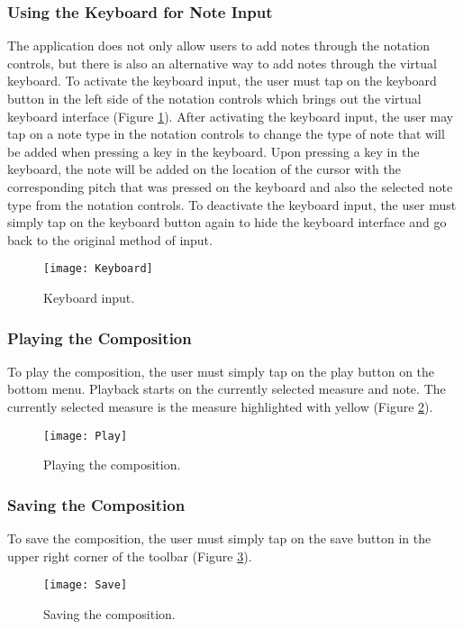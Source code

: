 \subsubsection{Using the Keyboard for Note Input}
The application does not only allow users to add notes through the notation controls, but there is also an alternative way to add notes through the virtual keyboard. To activate the keyboard input, the user must tap on the keyboard button in the left side of the notation controls which brings out the virtual keyboard interface (Figure \ref{fig:keyboard}). After activating the keyboard input, the user may tap on a note type in the notation controls to change the type of note that will be added when pressing a key in the keyboard. Upon pressing a key in the keyboard, the note will be added on the location of the cursor with the corresponding pitch that was pressed on the keyboard and also the selected note type from the notation controls. To deactivate the keyboard input, the user must simply tap on the keyboard button again to hide the keyboard interface and go back to the original method of input.

\begin{figure}[H]
	\centering
	\texttt{[image: Keyboard]}
    \caption{Keyboard input.}
    \label{fig:keyboard}
\end{figure}

\subsubsection{Playing the Composition}
To play the composition, the user must simply tap on the play button on the bottom menu. Playback starts on the currently selected measure and note. The currently selected measure is the measure highlighted with yellow (Figure \ref{fig:play}).

\begin{figure}[H]
	\centering
	\texttt{[image: Play]}
    \caption{Playing the composition.}
    \label{fig:play}
\end{figure}

\subsubsection{Saving the Composition}
To save the composition, the user must simply tap on the save button in the upper right corner of the toolbar (Figure \ref{fig:save}).

\begin{figure}[H]
	\centering
	\texttt{[image: Save]}
    \caption{Saving the composition.}
    \label{fig:save}
\end{figure}

